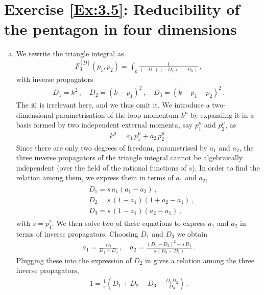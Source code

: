 
\section*{Exercise \ref{Ex:3.5}: Reducibility of the pentagon in four dimensions}
\label{Sol:3.5}
\begin{enumerate}[a)]
\item We rewrite the triangle integral as
\begin{align}
F^{[D]}_3(p_1,p_2) = \int_k \frac{1}{(-D_1) \, (-D_2) \, (-D_3)} \,,
\end{align}
with inverse propagators
\begin{align}
D_1 = k^2 \,, \quad D_2 =(k-p_1)^2 \,, \quad D_3 = (k-p_1-p_2)^2 \,.
\end{align}
The $\mathrm{i} 0$ is irrelevant here, and we thus omit it.
We introduce a two-dimensional parametrisation of the loop momentum $k^{\mu}$ by expanding it in a basis formed by two independent external momenta, say $p_1^{\mu}$ and $p_2^{\mu}$, as
\begin{align} \label{eq:k2D}
k^{\mu} = a_1 \, p_1^{\mu} + a_2 \, p_2^{\mu} \,.
\end{align}
Since there are only two degrees of freedom, parametrised by $a_1$ and $a_2$, the three inverse propagators of the triangle integral cannot be algebraically independent (over the field of the rational functions of $s$). In order to find the relation among them, we express them in terms of $a_1$ and $a_2$,
\begin{align} \label{eq:D2a}
\begin{aligned}
& D_1 = s \, a_1 (a_1-a_2) \,, \\ 
& D_2 = s \, (1-a_1) (1+a_2-a_1) \,, \\ 
& D_3 = s \, (1 - a_1) (a_2 - a_1) \,,
\end{aligned}
\end{align}
with $s=p_1^2$.
We then solve two of these equations to express $a_1$ and $a_2$ in terms of inverse propagators. Choosing $D_1$ and $D_3$ we obtain
\begin{align}
a_1 = \frac{D_1}{D_1-D_3} \,, \quad a_2 = \frac{(D_1-D_3)^2 - s \, D_1}{s \, (D_3-D_1)} \,.
\end{align}
Plugging these into the expression of $D_2$ in  gives a relation among the three inverse propagators,
\begin{align} \label{eq:triangle_relation_2D}
1 = \frac{1}{s} \left( D_1+D_2-D_3 - \frac{D_1 D_2}{D_3} \right) \,.

\end{align}
\end{enumerate}
